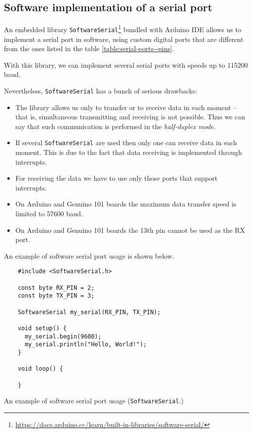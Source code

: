 \documentclass[../sparc.tex]{subfiles}
\begin{document}
\subsection{Software implementation of a serial port}

An embedded library
\texttt{SoftwareSerial}\footnote{\url{https://docs.arduino.cc/learn/built-in-libraries/software-serial/}}
bundled with Arduino IDE allows us to implement a serial port in software, using
custom digital ports that are different from the ones listed in the table
\ref{table:serial-ports--pins}.

With this library, we can implement several serial ports with speeds up to
115200 baud.

Nevertheless, \texttt{SoftwareSerial} has a bunch of serious drawbacks:
\begin{itemize}
\item The library allows us only to transfer or to receive data in each moment --
  that is, simultaneous transmitting and receiving is not possible. Thus we can
  say that such communication is performed in the \emph{half-duplex mode}.
\item If several \texttt{SoftwareSerial} are used then only one can receive data
  in each moment. This is due to the fact that data receiving is implemented
  through interrupts.
\item For receiving the data we have to use only those ports that support
  interrupts.
\item On Arduino and Genuino 101 boards the maximum data transfer speed is
  limited to 57600 baud.
\item On Arduino and Genuino 101 boards the 13th pin cannot be used as the RX
  port.
\end{itemize}

An example of software serial port usage is shown below.

\begin{listing}[H]
  \begin{verbatim}
    #include <SoftwareSerial.h>

    const byte RX_PIN = 2;
    const byte TX_PIN = 3;

    SoftwareSerial my_serial(RX_PIN, TX_PIN);

    void setup() {
      my_serial.begin(9600);
      my_serial.println("Hello, World!");
    }

    void loop() {

    }
  \end{verbatim}
  \label{listing:communication-serial-software}
  \caption{An example of software serial port usage (\texttt{SoftwareSerial}.)}
\end{listing}
\end{document}

